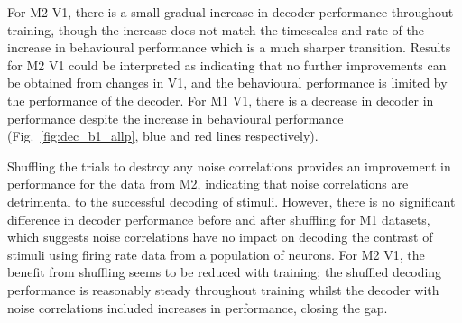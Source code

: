 For \ac{M2} \ac{V1}, there is a small gradual increase in decoder performance throughout training, though the increase does not match the timescales and rate of the increase in behavioural performance which is a much sharper transition.
Results for \ac{M2} \ac{V1} could be interpreted as indicating that no further improvements can be obtained from changes in \ac{V1}, and the behavioural performance is limited by the performance of the decoder.
For \ac{M1} \ac{V1}, there is a decrease in decoder in performance despite the increase in behavioural performance (Fig.~\ref{fig:dec_b1_allp}, blue and red lines respectively).


Shuffling the trials to destroy any noise correlations provides an improvement in performance for the data from \ac{M2}, indicating that noise correlations are detrimental to the successful decoding of stimuli.
However, there is no significant difference in decoder performance before and after shuffling for \ac{M1} datasets, which suggests noise correlations have no impact on decoding the contrast of stimuli using firing rate data from a population of neurons.
For \ac{M2} \ac{V1}, the benefit from shuffling seems to be reduced with training; the shuffled decoding performance is reasonably steady throughout training whilst the decoder with noise correlations included increases in performance, closing the gap.




